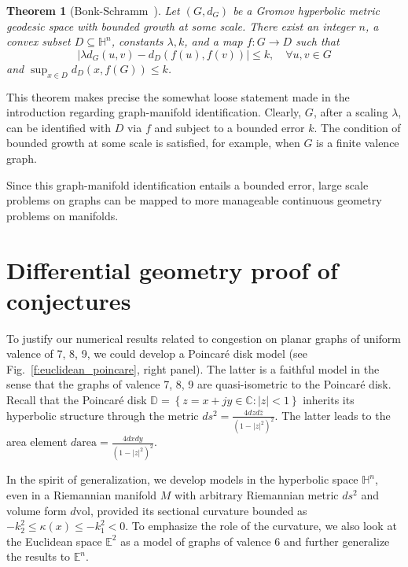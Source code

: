 \documentclass{article}
\newcommand{\area}{\mathrm{area}}
\newcommand{\vol}{\mathrm{vol}}
\newtheorem{theorem}{Theorem}
\begin{document}
\begin{theorem}[Bonk-Schramm~\cite{bonk_schramm}]
Let $(G,d_G)$ be a Gromov hyperbolic metric geodesic space with bounded growth at some scale. 
There exist an integer $n$, 
a convex subset $D \subseteq \mathbb{H}^n$, constants $\lambda,k$, and a map $f:G\rightarrow D$ 
such that 
$$ | \lambda d_G(u,v)-d_D(f(u),f(v))| \leq k, \quad \forall u,v \in G$$
and $\sup_{x\in D}d_D(x,f(G)) \leq k$. 
\end{theorem}
This theorem makes precise the somewhat loose statement made in the introduction regarding graph-manifold identification. 
Clearly, $G$, after a scaling $\lambda$, can be identified with $D$ via $f$ and subject to a bounded error $k$. 
The condition of bounded growth at some scale is satisfied, for example, when $G$ is a finite valence graph. 

Since this graph-manifold identification entails a bounded error, large scale problems on graphs can be mapped to more manageable continuous geometry problems on manifolds.

\noindent 

\noindent 
\section{Differential geometry proof of conjectures} 
\label{s:dif_geom}

To justify our numerical results related to congestion on planar graphs of uniform valence of 7, 8, 9, 
we could develop a Poincar\'e disk model (see Fig.~\ref{f:euclidean_poincare}, right panel). 
The latter is a faithful model 
in the sense that the graphs of valence 7, 8, 9 are quasi-isometric to the Poincar\'e disk. 
Recall that the Poincar\'e disk 
$\mathbb{D}=\left\{z=x+jy\in \mathbb{C}:\left|z\right|<1\right\}$ 
inherits its hyperbolic structure through the metric 
$ds^{2} =\frac{4dzd\bar{z}}{\left(1-\left|z\right|^{2} \right)^{2} } $. 
The latter leads to the area element $d\area=\frac{4dxdy}{\left(1-\left|z\right|^{2} \right)^{2} } $.

In the spirit of generalization, we develop models in the hyperbolic space $\mathbb{H}^n$, 
even in a Riemannian manifold $M$ with arbitrary Riemannian metric $ds^2$ and volume form $d\vol$,  
provided its sectional curvature bounded as $-k_2^2 \leq \kappa(x) \leq -k_1^2 <0$. 
To emphasize the role of the curvature, we also look at the Euclidean space $\mathbb{E}^2$ 
as a model of graphs of valence $6$ and further generalize the results to $\mathbb{E}^n$.  
\end{document}
